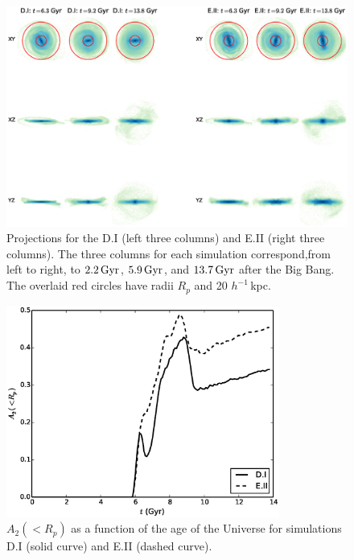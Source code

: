 \begin{figure}
	\centering
	\includegraphics[width=\textwidth]{../figures/cosmo_three_by_threes.eps}
	\caption{Projections for the D.I (left three columns) and E.II
          (right three columns).  The three columns for each
          simulation correspond,from left to right, to $2.2\,{\rm
            Gyr}$, $5.9\,{\rm Gyr}$, and $13.7\,{\rm Gyr}$ after the
          Big Bang. The overlaid red circles have radii $R_p$ and 20
          $h^{-1} \,$kpc.} \label{fig:face_on_cosmo}
\end{figure}

\begin{figure}
	\centering
	\includegraphics[width=0.8\textwidth]{../figures/cosmo_a2_vs_t_2rd_weighted.eps}
	\caption{$A_2(<R_p)$ as a function of the age of the Universe
          for simulations D.I (solid curve) and E.II (dashed
          curve). } \label{fig:cosmo_a2_vs_t}
\end{figure}



